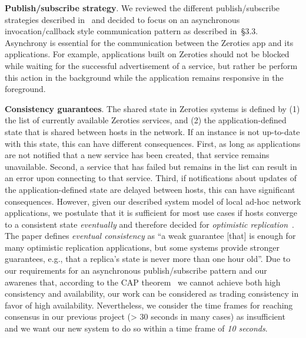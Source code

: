 \textbf{Publish/subscribe strategy}. 
We reviewed the different publish/subscribe strategies described in~\cite{eugster_2003} and decided to focus on an asynchronous invocation/callback style communication pattern as described in~\cite{eugster_2003}§3.3. 
Asynchrony is essential for the communication between the Zeroties app and its applications.
For example, applications built on Zeroties should not be blocked while waiting for the successful advertisement of a service, but rather be perform this action in the background while the application remains responsive in the foreground.

\textbf{Consistency guarantees}.
The shared state in Zeroties systems is defined by (1) the list of currently available Zeroties services, and (2) the application-defined state that is shared between hosts in the network.
If an instance is not up-to-date with this state, this can have different consequences. 
First, as long as applications are not notified that a new service has been created, that service remains unavailable.
Second, a service that has failed but remains in the list can result in an error upon connecting to that service. 
Third, if notifications about updates of the application-defined state are delayed between hosts, this can have significant consequences.
However, given our described system model of local ad-hoc network applications, we postulate that it is sufficient for most use cases if hosts converge to a consistent state \textit{eventually} and therefore decided for \textit{optimistic replication}~\cite{saito_2005}.
The paper defines \textit{eventual consistency} as ``a weak guarantee [that] is enough for many optimistic replication applications, but some systems provide stronger guarantees, e.g., that a replica's state is never more than one hour old''.
Due to our requirements for an asynchronous publish/subscribe pattern and our awarenes that, according to the CAP theorem~\cite{gilbert_2012} we cannot achieve both high consistency and availability, our work can be considered as trading consistency in favor of high availability.
Nevertheless, we consider the time frames for reaching consensus in our previous project (> 30 seconds in many cases) as insufficient and we want our new system to do so within a time frame of \textit{10 seconds}.

